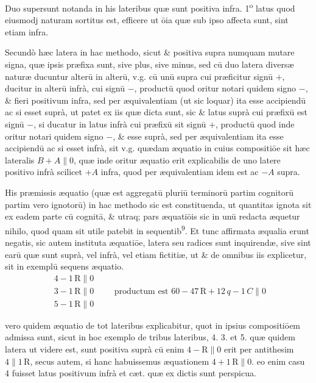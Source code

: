 \documentclass[11pt,a4paper]{article}
\begin{document}
Duo supersunt notanda in his lateribus quæ sunt positiva infra. 1\textsuperscript{o} latus quod eiusmodj naturam sortitus est, efficere ut ōia quæ sub ipso affecta sunt, sint etiam infra.

Secundò hæc latera in hac methodo, sicut \& positiva supra numquam mutare signa, quæ ipsis præfixa sunt, sive plus, sive minus, sed cū duo latera diversæ naturæ ducuntur alterū in alterū, v.g. cū unū supra cui præficitur signū $+$, ducitur in alterū infrà, cui signū $-$, productū quod oritur notari quidem signo $-$, \& fieri positivum infra, sed per æquivalentiam (ut sic loquar) ita esse accipiendū ac si esset suprà, ut patet ex iis quæ dicta sunt, sic \& latus suprà cui præfixū est signū $-$, si ducatur in latus infrà cui præfixū sit signū $+$, productū quod inde oritur notari quidem signo $-$, \& esse suprà, sed per æquivalentiam ita esse accipiendū ac si esset infrà, sit v.g. quædam æquatio in cuius compositiōe sit hæc lateralis $B + A \parallel 0$, quæ inde oritur æquatio erit explicabilis de uno latere positivo infrà scilicet $+A$ infra, quod per æquivalentiam idem est ac $-A$ supra.

His præmissis æquatio (quæ est aggregatū pluriū terminorū partim cognitorū partim vero ignotorū) in hac methodo sic est constituenda, ut quantitas ignota sit ex eadem parte cū cognitā, \& utraq; pars æquatiōis sic in unū redacta æquetur nihilo, quod quam sit utile patebit in sequentib\textsuperscript{9}. Et tunc affirmata æqualia erunt negatis, sic autem instituta æquatiōe, latera seu radices sunt inquirendæ, sive sint earū quæ sunt suprà, vel infrà, vel etiam fictitiæ, ut \& de omnibus iis explicetur, sit in exemplū sequens æquatio.
\[ \begin{array}{l} 4 - 1\,\mathrm{R} \parallel 0 \\ 3 - 1\,\mathrm{R} \parallel 0 \\ 5 - 1\,\mathrm{R} \parallel 0 \end{array} \qquad \text{productum est } 60 - 47\,\mathrm{R} + 12\,q - 1\,C \parallel 0 \]


\uncertain{\&} vero quidem æquatio de tot lateribus explicabitur, quot in ipsius compositiōem admissa sunt, sicut in hoc exemplo de tribus lateribus, 4. 3. et 5. quæ quidem latera ut videre est, sunt positiva suprà cū enim $4 - \mathrm{R} \parallel 0$ erit per antithesim $4 \parallel 1\,\mathrm{R}$, secus autem, si hanc habuissemus æquationem $4 + 1\,\mathrm{R} \parallel 0$. eo enim casu 4 fuisset latus positivum infrà et cæt. quæ ex dictis sunt perspicua.
\end{document}
